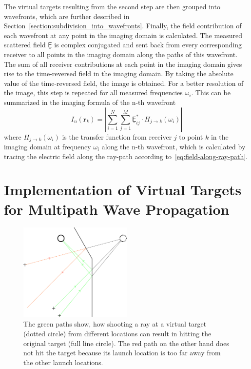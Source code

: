 The virtual targets resulting from the second step are then grouped into wavefronts, which are further described in Section~\ref{section:subdivision_into_wavefronts}.
Finally, the field contribution of each wavefront at any point in the imaging domain is calculated.
The measured scattered field \(\underline{\mathsf{E}}\) is complex conjugated and sent back from every corresponding receiver to all points in the imaging domain along the paths of this wavefront.
The sum of all receiver contributions at each point in the imaging domain gives rise to the time-reversed field in the imaging domain.
By taking the absolute value of the time-reversed field, the image is obtained.
For a better resolution of the image, this step is repeated for all measured frequencies \(\omega_i\).
This can be summarized in the imaging formula of the n-th wavefront
\begin{equation}
    I_n(\bm{r}_k) = |\sum_{i=1}^{N} \sum_{j=1}^{M} \underline{\mathsf{E}}_{ij}^* \cdot H_{j \rightarrow k}(\omega_i)|
\end{equation}
where \(H_{j \rightarrow k}(\omega_i)\) is the transfer function from receiver \(j\) to point \(k\) in the imaging domain at frequency \(\omega_i\) along the n-th wavefront, which is calculated by tracing the electric field along the ray-path according to~\eqref{eq:field-along-ray-path}.


\section{Implementation of Virtual Targets for Multipath Wave Propagation}\label{section:virtual_targets}

\begin{figure}[ht]
    \centering
    \includegraphics[width=0.5\textwidth]{figures/VirtualTargets.pdf}
    \caption{The green paths show, how shooting a ray at a virtual target (dotted circle) from different locations can result in hitting the original target (full line circle). The red path on the other hand does not hit the target because its launch location is too far away from the other launch locations.}\label{fig:virtual_targets}
\end{figure}

